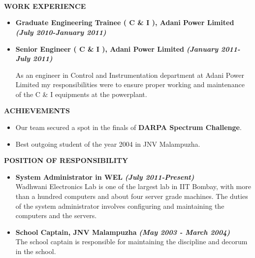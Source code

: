 \documentclass[a4paper,10pt]{article}
\begin{document}
{\qquad \\ \\ \\ \\ \\ \\ \\ \\ \\ \\ \\ \\ \\}

 \colorbox{titleColor}{\parbox{6.5in}{\textbf{WORK EXPERIENCE}}}

 \begin{itemize}
 \setlength{\itemsep}{1pt}
 \item \textbf{Graduate Engineering Trainee ( C \& I ), Adani Power Limited}  \textbf \emph{(July 2010-January 2011)}
 \item \textbf{Senior Engineer ( C \& I ), Adani Power Limited}  \textbf \emph{(January 2011-July 2011)}
 
 As an engineer in Control and Instrumentation department at Adani Power Limited my responsibilities were to ensure proper
 working and maintenance of the C \& I equipments at the powerplant.
 
 \end{itemize}
 
 \colorbox{titleColor}{\parbox{6.5in}{\textbf{ACHIEVEMENTS}}}

 \begin{itemize}
  \item Our team secured a spot in the finals of \textbf{DARPA Spectrum Challenge}.
 \item Best outgoing student of the year 2004 in JNV Malampuzha.
  \end{itemize}
  
 \colorbox{titleColor}{\parbox{6.5in}{\textbf{POSITION OF RESPONSIBILITY}}}

 \begin{itemize}
 \setlength{\itemsep}{1pt}
 \item \textbf{System Administrator in WEL} \textbf \emph{(July 2011-Present)} \\
Wadhwani Electronics Lab is one of the largest lab in IIT Bombay, with more than a hundred computers and about 
four server grade machines. The duties of the system administrator involves configuring and maintaining the
computers and the servers.
\item \textbf{School Captain, JNV Malampuzha} \textbf \emph{(May 2003 - March 2004)} \\
The school captain is responsible for maintaining the discipline and decorum in the school.
 \end{itemize}
 
\end{document}
